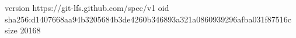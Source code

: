 version https://git-lfs.github.com/spec/v1
oid sha256:d1407668aa94b3205684b3de4260b346893a321a0860939296afba031f87516c
size 20168
